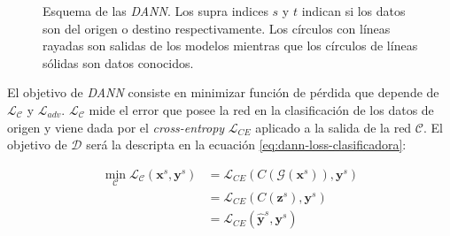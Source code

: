 \begin{figure}[H]

    \caption{Esquema de las {\it DANN}. Los supra indices $s$ y $t$ indican si los datos son del origen o destino respectivamente.
        Los c\'irculos con l\'ineas rayadas son salidas de los modelos mientras que los c\'irculos de l\'ineas s\'olidas son datos conocidos.}
    \label{fig:dann-esquema}
\end{figure}

El objetivo de {\it DANN} consiste en minimizar funci\'on de p\'erdida que depende de $\mathcal{L}_\mathcal{C}$ y
$\mathcal{L}_{adv}$. $\mathcal{L}_\mathcal{C}$ mide el error que posee la red en la clasificaci\'on de los datos de
origen y viene dada por el {\it cross-entropy} $\mathcal{L}_{CE}$ aplicado a la salida de la red $\mathcal{C}$. El
objetivo de $\mathcal{D}$ ser\'a la descripta en la ecuaci\'on \ref{eq:dann-loss-clasificadora}:

\begin{align}
    \min_{\mathcal{C}} \mathcal{L}_\mathcal{C}(\mathbf{x}^s, \mathbf{y}^s) & = \mathcal{L}_{CE}(C(\mathcal{G}(\mathbf{x}^s)), \mathbf{y}^s) \nonumber \\
                                                                           & = \mathcal{L}_{CE}(C(\mathbf{z}^s), \mathbf{y}^s) \nonumber              \\
                                                                           & = \mathcal{L}_{CE}(\hat{\mathbf{y}}^s, \mathbf{y}^s)
    \label{eq:dann-loss-clasificadora}
\end{align}

